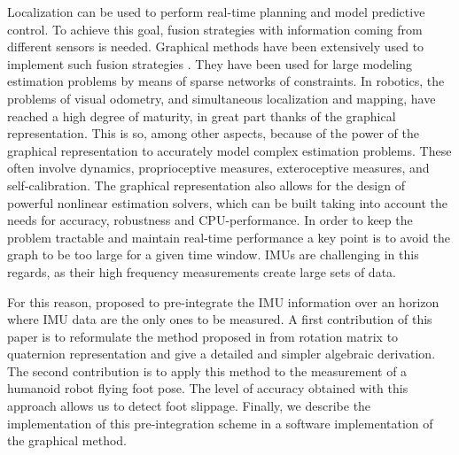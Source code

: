 Localization can be used to perform real-time planning and model predictive control.
To achieve this goal, fusion strategies with information coming from different sensors is needed.
Graphical methods have been extensively used to implement such fusion strategies \cite{Thrun:ijrr:2006,Kaess:itro:2008}.
They have been used for large modeling estimation problems by means of sparse networks of constraints. 
In robotics, the problems of visual odometry, and simultaneous localization and mapping, have reached a high degree of maturity, 
in great part thanks of the graphical representation. 
This is so, among other aspects, because of the power of the graphical representation to accurately model complex estimation problems. 
These often involve dynamics, proprioceptive measures, exteroceptive measures, and self-calibration.
The graphical representation also allows for the design of powerful nonlinear estimation solvers, which can be built taking into account the needs for accuracy, 
robustness and CPU-performance.
In order to keep the problem tractable and maintain real-time performance a key point is to avoid the graph to be too large for a given time window.
IMUs are challenging in this regards, as their high frequency measurements create large sets of data. 
 
For this reason, \cite{LUPTON-09,forster2015imu} proposed to pre-integrate the IMU information over an horizon where IMU data are the only
ones to be measured.
A first contribution of this paper is to reformulate the method proposed in \cite{forster2015imu} from rotation matrix to quaternion representation
and give a detailed and simpler algebraic derivation.
The second contribution is to apply this method to the measurement of a humanoid robot flying foot pose.
The level of accuracy obtained with this approach allows us to detect foot slippage. 
Finally, we describe the implementation of this pre-integration scheme in a software implementation of the graphical method.




